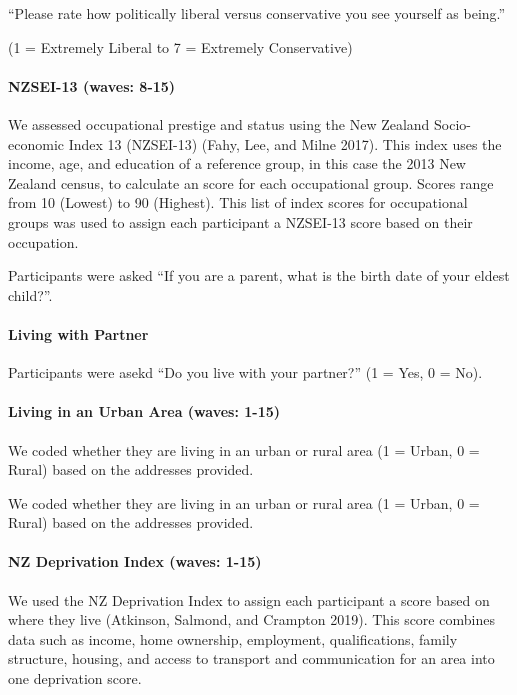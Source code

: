 \documentclass[
  letterpaper,
  DIV=11,
  numbers=noendperiod]{scrartcl}
\let\oldparagraph\paragraph
\renewcommand{\paragraph}[1]{\oldparagraph{#1}\mbox{}}
\begin{document}
``Please rate how politically liberal versus conservative you see
yourself as being.''

(1 = Extremely Liberal to 7 = Extremely Conservative)

\hypertarget{nzsei-13-waves-8-15}{%
\paragraph{NZSEI-13 (waves: 8-15)}\label{nzsei-13-waves-8-15}}

We assessed occupational prestige and status using the New Zealand
Socio-economic Index 13 (NZSEI-13) (Fahy, Lee, and Milne 2017). This
index uses the income, age, and education of a reference group, in this
case the 2013 New Zealand census, to calculate an score for each
occupational group. Scores range from 10 (Lowest) to 90 (Highest). This
list of index scores for occupational groups was used to assign each
participant a NZSEI-13 score based on their occupation.

Participants were asked ``If you are a parent, what is the birth date of
your eldest child?''.

\hypertarget{living-with-partner}{%
\paragraph{Living with Partner}\label{living-with-partner}}

Participants were asekd ``Do you live with your partner?'' (1 = Yes, 0 =
No).

\hypertarget{living-in-an-urban-area-waves-1-15}{%
\paragraph{Living in an Urban Area (waves:
1-15)}\label{living-in-an-urban-area-waves-1-15}}

We coded whether they are living in an urban or rural area (1 = Urban, 0
= Rural) based on the addresses provided.

We coded whether they are living in an urban or rural area (1 = Urban, 0
= Rural) based on the addresses provided.

\hypertarget{nz-deprivation-index-waves-1-15}{%
\paragraph{NZ Deprivation Index (waves:
1-15)}\label{nz-deprivation-index-waves-1-15}}

We used the NZ Deprivation Index to assign each participant a score
based on where they live (Atkinson, Salmond, and Crampton 2019). This
score combines data such as income, home ownership, employment,
qualifications, family structure, housing, and access to transport and
communication for an area into one deprivation score.
\end{document}
